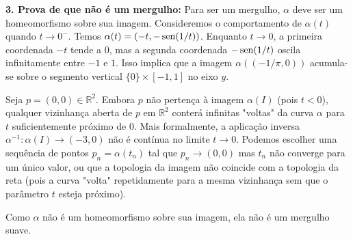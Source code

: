 {	\textbf{3. Prova de que não é um mergulho:}
	Para ser um mergulho, $\alpha$ deve ser um homeomorfismo sobre sua imagem. Consideremos o comportamento de $\alpha(t)$ quando $t \to 0^-$. 
	Temos $\alpha(t) = (-t, -\operatorname{sen}(1/t))$. Enquanto $t \to 0$, a primeira coordenada $-t$ tende a $0$, mas a segunda coordenada $-\operatorname{sen}(1/t)$ oscila infinitamente entre $-1$ e $1$.
	Isso implica que a imagem $\alpha((-1/\pi, 0))$ acumula-se sobre o segmento vertical $\{0\} \times [-1, 1]$ no eixo $y$.
	
	Seja $p = (0, 0) \in \mathbb{R}^2$. Embora $p$ não pertença à imagem $\alpha(I)$ (pois $t < 0$), qualquer vizinhança aberta de $p$ em $\mathbb{R}^2$ conterá infinitas "voltas" da curva $\alpha$ para $t$ suficientemente próximo de $0$. 
	Mais formalmente, a aplicação inversa $\alpha^{-1} : \alpha(I) \to (-3, 0)$ não é contínua no limite $t \to 0$. Podemos escolher uma sequência de pontos $p_n = \alpha(t_n)$ tal que $p_n \to (0,0)$ mas $t_n$ não converge para um único valor, ou que a topologia da imagem não coincide com a topologia da reta (pois a curva "volta" repetidamente para a mesma vizinhança sem que o parâmetro $t$ esteja próximo).
	
	Como $\alpha$ não é um homeomorfismo sobre sua imagem, ela não é um mergulho suave.
}

